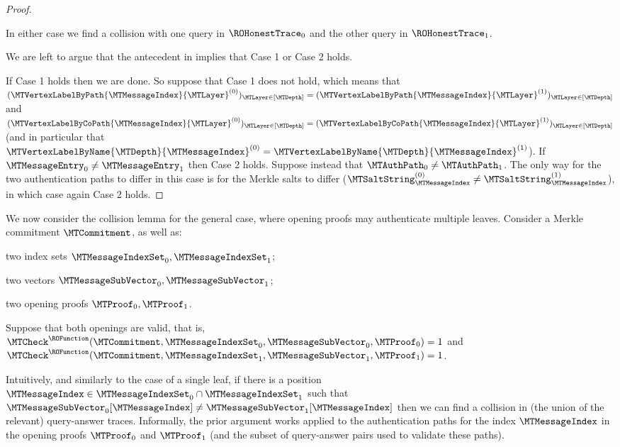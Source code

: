 \begin{proof}
\begin{itemize}
\end{itemize}
In either case we find a collision with one query in $\ROHonestTrace_{0}$ and the other query in $\ROHonestTrace_{1}$.

We are left to argue that the antecedent in  implies that Case 1 or Case 2 holds.

If Case 1 holds then we are done. So suppose that Case 1 does not hold, which means that $(\MTVertexLabelByPath{\MTMessageIndex}{\MTLayer}^{(0)})_{\MTLayer \in [\MTDepth]}=(\MTVertexLabelByPath{\MTMessageIndex}{\MTLayer}^{(1)})_{\MTLayer \in [\MTDepth]}$ and $(\MTVertexLabelByCoPath{\MTMessageIndex}{\MTLayer}^{(0)})_{\MTLayer \in [\MTDepth]}=(\MTVertexLabelByCoPath{\MTMessageIndex}{\MTLayer}^{(1)})_{\MTLayer \in [\MTDepth]}$ (and in particular that $\MTVertexLabelByName{\MTDepth}{\MTMessageIndex}^{(0)}=\MTVertexLabelByName{\MTDepth}{\MTMessageIndex}^{(1)}$). If $\MTMessageEntry_{0} \neq \MTMessageEntry_{1}$ then Case 2 holds. Suppose instead that $\MTAuthPath_{0} \neq \MTAuthPath_{1}$. The only way for the two authentication paths to differ in this case is for the Merkle salts to differ ($\MTSaltString_{\MTMessageIndex}^{(0)} \neq \MTSaltString_{\MTMessageIndex}^{(1)}$), in which case again Case 2 holds.
\end{proof}

We now consider the collision lemma for the general case, where opening proofs may authenticate multiple leaves. Consider a Merkle commitment $\MTCommitment$, as well as:
\begin{inparaenum}[\emptylabel]
  \item two index sets $\MTMessageIndexSet_{0},\MTMessageIndexSet_{1}$;
  \item two vectors $\MTMessageSubVector_{0},\MTMessageSubVector_{1}$;
  \item two opening proofs $\MTProof_{0},\MTProof_{1}$.
\end{inparaenum}
Suppose that both openings are valid, that is, $\MTCheck^{\ROFunction}(\MTCommitment,\MTMessageIndexSet_{0},\MTMessageSubVector_{0},\MTProof_{0})=1$ and $\MTCheck^{\ROFunction}(\MTCommitment,\MTMessageIndexSet_{1},\MTMessageSubVector_{1},\MTProof_{1})=1$.

Intuitively, and similarly to the case of a single leaf, if there is a position $\MTMessageIndex \in \MTMessageIndexSet_{0} \cap \MTMessageIndexSet_{1}$ such that $\MTMessageSubVector_{0}[\MTMessageIndex] \neq \MTMessageSubVector_{1}[\MTMessageIndex]$ then we can find a collision in (the union of the relevant) query-answer traces. Informally, the prior argument works applied to the authentication paths for the index $\MTMessageIndex$ in the opening proofs $\MTProof_{0}$ and $\MTProof_{1}$ (and the subset of query-answer pairs used to validate these paths).

